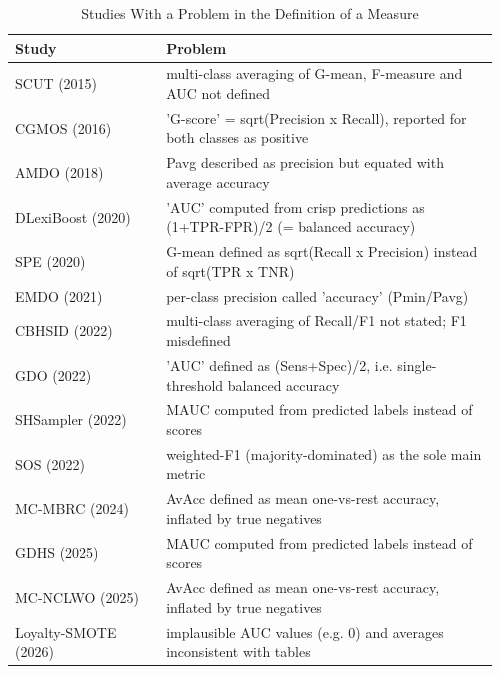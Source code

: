 \begin{table}[t]
  \caption{Studies With a Problem in the Definition of a Measure}
  \label{tab:empirical-metric-issues}
  \footnotesize
  \setlength{\tabcolsep}{4pt}
  \begin{tabular}{@{}>{\raggedright\arraybackslash}p{0.3\linewidth}>{\raggedright\arraybackslash}p{0.66\linewidth}@{}}
    \toprule
    Study & Problem\\
    \midrule
    SCUT (2015)~\parencite{agrawal2015scut} & multi-class averaging of G-mean, F-measure and AUC not defined\\
    CGMOS (2016)~\parencite{zhang2016cgmos} & 'G-score' = sqrt(Precision x Recall), reported for both classes as positive\\
    AMDO (2018)~\parencite{yang2018amdo} & Pavg described as precision but equated with average accuracy\\
    DLexiBoost (2020)~\parencite{datta2020dlexiboost} & 'AUC' computed from crisp predictions as (1+TPR-FPR)/2 (= balanced accuracy)\\
    SPE (2020)~\parencite{liu2020spe} & G-mean defined as sqrt(Recall x Precision) instead of sqrt(TPR x TNR)\\
    EMDO (2021)~\parencite{yao2021emdo} & per-class precision called 'accuracy' (Pmin/Pavg)\\
    CBHSID (2022)~\parencite{palli2022cbhsid} & multi-class averaging of Recall/F1 not stated; F1 misdefined\\
    GDO (2022)~\parencite{xie2022gdo} & 'AUC' defined as (Sens+Spec)/2, i.e. single-threshold balanced accuracy\\
    SHSampler (2022)~\parencite{zheng2022shsampler} & MAUC computed from predicted labels instead of scores\\
    SOS (2022)~\parencite{kim2022sos} & weighted-F1 (majority-dominated) as the sole main metric\\
    MC-MBRC (2024)~\parencite{ma2024mcmbrc} & AvAcc defined as mean one-vs-rest accuracy, inflated by true negatives\\
    GDHS (2025)~\parencite{yan2025gdhs} & MAUC computed from predicted labels instead of scores\\
    MC-NCLWO (2025)~\parencite{tao2025mcnclwo} & AvAcc defined as mean one-vs-rest accuracy, inflated by true negatives\\
    Loyalty-SMOTE (2026)~\parencite{hu2026loyalty} & implausible AUC values (e.g. 0) and averages inconsistent with tables\\
    \bottomrule
  \end{tabular}
\end{table}
